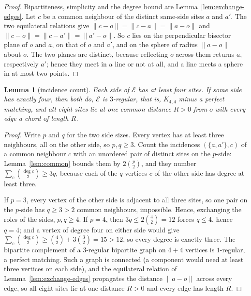 \documentclass[11pt]{amsart}
\newtheorem{lemma}[theorem]{Lemma}
\theoremstyle{definition}
\begin{document}
\begin{proof}
Bipartiteness, simplicity and the degree bound are
Lemma~\ref{lem:exchange-edges}.  Let $c$ be a common neighbour of the distinct
same-side sites $a$ and $a'$.  The two equilateral relations give
$\|c-o\|=\|c-a\|=\|a-o\|$ and $\|c-o\|=\|c-a'\|=\|a'-o\|$.  So $c$ lies on
the perpendicular bisector plane of $o$ and $a$, on that of $o$ and $a'$, and
on the sphere of radius $\|a-o\|$ about $o$.  The two planes are distinct,
because reflecting $o$ across them returns $a$, respectively $a'$; hence they
meet in a line or not at all, and a line meets a sphere in at most two points.
\end{proof}

\begin{lemma}[incidence count]
\label{lem:count}
Each side of $\mathcal E$ has at least four sites.  If some side has exactly
four, then both do, $\mathcal E$ is $3$-regular, that is, $K_{4,4}$ minus a perfect
matching, and all eight sites lie at one common distance $R>0$ from $o$ with
every edge a chord of length $R$.
\end{lemma}

\begin{proof}
Write $p$ and $q$ for the two side sizes.  Every vertex has at least three
neighbours, all on the other side, so $p,q\ge3$.  Count the incidences
$(\{a,a'\},c)$ of a common neighbour $c$ with an unordered pair of distinct
sites on the $p$-side: Lemma~\ref{lem:common} bounds them by
$2\binom p2$, and they number
$\sum_{c}\binom{\deg c}{2}\ge3q$, because each of the $q$ vertices $c$ of the
other side has degree at least three.

If $p=3$, every vertex of the other side is adjacent to all three sites, so
one pair on the $p$-side has $q\ge3>2$ common neighbours, impossible.  Hence,
exchanging the roles of the sides, $p,q\ge4$.  If $p=4$, then
$3q\le2\binom42=12$ forces $q\le4$, hence $q=4$; and a vertex of degree four
on either side would give
$\sum_c\binom{\deg c}{2}\ge\binom42+3\binom32=15>12$, so every degree is
exactly three.  The bipartite complement of a $3$-regular bipartite graph on
$4+4$ vertices is $1$-regular, a perfect matching.  Such a graph is connected
(a component would need at least three vertices on each side), and the
equilateral relation of Lemma~\ref{lem:exchange-edges} propagates the
distance $\|a-o\|$ across every edge, so all eight sites lie at one distance
$R>0$ and every edge has length $R$.
\end{proof}
\end{document}
